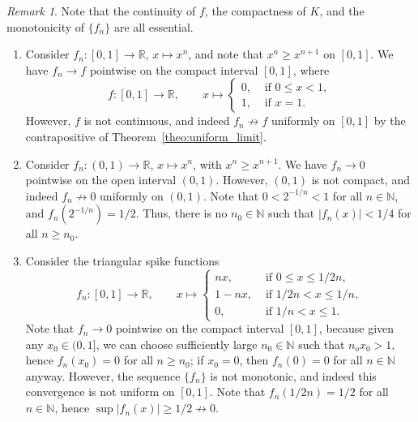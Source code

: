 \documentclass[11pt]{article}
\def\R{\mathbb{R}}
\def\N{\mathbb{N}}
\theoremstyle{definition}
\theoremstyle{remark}
\newtheorem*{remark}{Remark}
\begin{document}
    \begin{remark}
        Note that the continuity of $f$, the compactness of $K$, and the monotonicity
        of $\{f_n\}$ are all essential.
        \begin{enumerate}
            \item Consider $f_n\colon [0, 1] \to \R$, $x \mapsto x^n$, and note that
            $x^n \geq x^{n + 1}$ on $[0, 1]$. We have $f_n \to f$ pointwise on the
            compact interval $[0, 1]$, where \[
                f\colon [0, 1]\to \R, \qquad x \mapsto \begin{cases}
                    0, &\text{ if }0 \leq x < 1, \\
                    1, &\text{ if }x = 1.
                \end{cases}
            \] However, $f$ is not continuous, and indeed $f_n \not\to f$ uniformly
            on $[0, 1]$ by the contrapositive of Theorem~\ref{theo:uniform_limit}.
            
            \item Consider $f_n\colon (0, 1) \to \R$, $x \mapsto x^n$, with $x^n \geq
            x^{n + 1}$. We have $f_n \to 0$ pointwise on the open interval $(0, 1)$.
            However, $(0, 1)$ is not compact, and indeed $f_n \not\to 0$ uniformly on
            $(0, 1)$. Note that $0 < 2^{-1 / n} < 1$ for all $n \in \N$, and
            $f_n(2^{-1 / n}) = 1 / 2$. Thus, there is no $n_0 \in \N$ such that
            $|f_n(x)| < 1 / 4$ for all $n \geq n_0$.

            \item Consider the triangular spike functions \[
                f_n\colon [0, 1] \to \R, \qquad x \mapsto \begin{cases}
                    nx, &\text{ if } 0 \leq x \leq 1 / 2n, \\
                    1 - nx, &\text{ if } 1 /2n < x \leq 1 / n, \\
                    0, &\text{ if } 1 / n < x \leq 1.
                \end{cases}
            \] Note that $f_n \to 0$ pointwise on the compact interval $[0, 1]$,
            because given any $x_0 \in (0, 1]$, we can choose sufficiently large $n_0
            \in \N$ such that $n_ox_0 > 1$, hence $f_n(x_0) = 0$ for all $n \geq
            n_0$; if $x_0 = 0$, then $f_n(0) = 0$ for all $n \in \N$ anyway. However,
            the sequence $\{f_n\}$ is not monotonic, and indeed this convergence is
            not uniform on $[0, 1]$. Note that $f_n(1 / 2n) = 1 / 2$ for all $n \in
            \N$, hence $\sup |f_n(x)| \geq 1 / 2 \not\to 0$.
        \end{enumerate}
    \end{remark}
\end{document}
